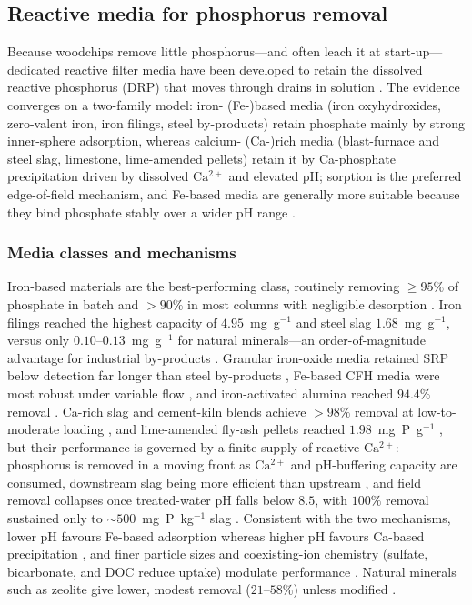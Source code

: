 \documentclass[11pt]{article}
\begin{document}
\subsection{Reactive media for phosphorus removal}

Because woodchips remove little phosphorus---and often leach it at
start-up---dedicated reactive filter media have been developed to retain the
dissolved reactive phosphorus (DRP) that moves through drains in solution
\parencite{Christianson2021}. The evidence converges on a two-family model:
iron- (Fe-)based media (iron oxyhydroxides, zero-valent iron, iron filings,
steel by-products) retain phosphate mainly by strong inner-sphere adsorption,
whereas calcium- (Ca-)rich media (blast-furnace and steel slag, limestone,
lime-amended pellets) retain it by Ca-phosphate precipitation driven by
dissolved $\mathrm{Ca^{2+}}$ and elevated pH; sorption is the preferred
edge-of-field mechanism, and Fe-based media are generally more suitable
because they bind phosphate stably over a wider pH range
\parencite{Mendes2022,Li2020}.

\subsubsection{Media classes and mechanisms}

Iron-based materials are the best-performing class, routinely removing
$\geq95\%$ of phosphate in batch and $>90\%$ in most columns with negligible
desorption \parencite{Allred2014,Allred2012,Allred2017,Mendes2022}. Iron
filings reached the highest capacity of $4.95$~mg~g$^{-1}$ and steel slag
$1.68$~mg~g$^{-1}$, versus only $0.10$--$0.13$~mg~g$^{-1}$ for natural
minerals---an order-of-magnitude advantage for industrial by-products
\parencite{Sellner2019b}. Granular iron-oxide media retained SRP below
detection far longer than steel by-products \parencite{Hauda2020}, Fe-based
CFH media were most robust under variable flow \parencite{Pugliese2023}, and
iron-activated alumina reached $94.4\%$ removal \parencite{Kumari2025}. Ca-rich
slag and cement-kiln blends achieve $>98\%$ removal at low-to-moderate
loading \parencite{Agrawal2011,Sanford2016}, and lime-amended fly-ash pellets
reached $1.98$~mg~P~g$^{-1}$ \parencite{Li2017}, but their performance is
governed by a finite supply of reactive $\mathrm{Ca^{2+}}$: phosphorus is
removed in a moving front as $\mathrm{Ca^{2+}}$ and pH-buffering capacity are
consumed, downstream slag being more efficient than upstream
\parencite{Wang2020d}, and field removal collapses once treated-water pH falls
below $8.5$, with $100\%$ removal sustained only to $\sim500$~mg~P~kg$^{-1}$
slag \parencite{Penn2020}. Consistent with the two mechanisms, lower pH favours
Fe-based adsorption whereas higher pH favours Ca-based precipitation
\parencite{Mendes2022}, and finer particle sizes and coexisting-ion chemistry
(sulfate, bicarbonate, and DOC reduce uptake) modulate performance
\parencite{Li2020,Sellner2019b,Pugliese2023}. Natural minerals such as zeolite
give lower, modest removal ($21$--$58\%$) unless modified \parencite{Agrawal2011,Sadeghi2021}.
\end{document}
